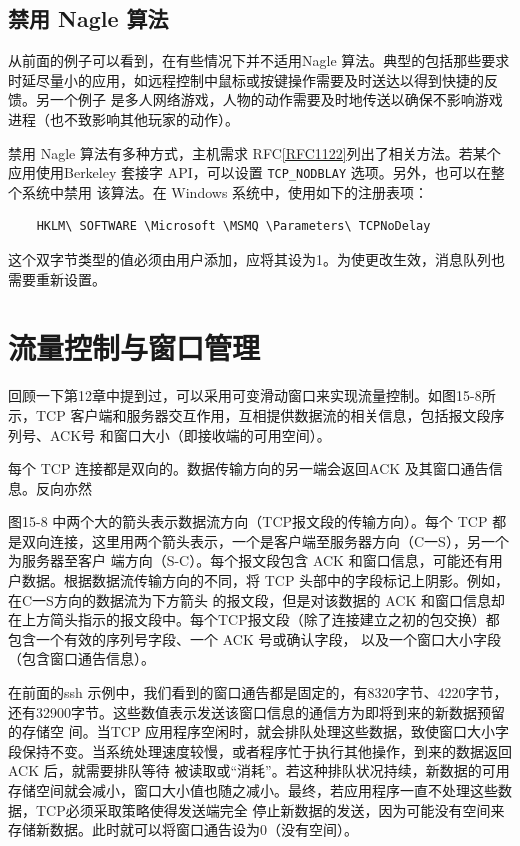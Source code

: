 \subsection{禁用 Nagle 算法}
从前面的例子可以看到，在有些情况下并不适用Nagle 算法。典型的包括那些要求时延尽量小的应用，如远程控制中鼠标或按键操作需要及时送达以得到快捷的反馈。另一个例子
是多人网络游戏，人物的动作需要及时地传送以确保不影响游戏进程（也不致影响其他玩家的动作）。

禁用 Nagle 算法有多种方式，主机需求 RFC\href{https://www.rfc-editor.org/rfc/rfc1122}{[RFC1122]}列出了相关方法。若某个应用使用Berkeley 套接字 API，可以设置 \verb|TCP_NODBLAY| 选项。另外，也可以在整个系统中禁用
该算法。在 Windows 系统中，使用如下的注册表项：
\begin{verbatim}
    HKLM\ SOFTWARE \Microsoft \MSMQ \Parameters\ TCPNoDelay
\end{verbatim}
这个双字节类型的值必须由用户添加，应将其设为1。为使更改生效，消息队列也需要重新设置。

\section{流量控制与窗口管理}
回顾一下第12章中提到过，可以采用可变滑动窗口来实现流量控制。如图15-8所示，TCP 客户端和服务器交互作用，互相提供数据流的相关信息，包括报文段序列号、ACK号
和窗口大小（即接收端的可用空间）。

每个 TCP 连接都是双向的。数据传输方向的另一端会返回ACK 及其窗口通告信息。反向亦然

图15-8 中两个大的箭头表示数据流方向（TCP报文段的传输方向）。每个 TCP 都是双向连接，这里用两个箭头表示，一个是客户端至服务器方向（C一S），另一个为服务器至客户
端方向（S-C）。每个报文段包含 ACK 和窗口信息，可能还有用户数据。根据数据流传输方向的不同，将 TCP 头部中的字段标记上阴影。例如，在C一S方向的数据流为下方箭头
的报文段，但是对该数据的 ACK 和窗口信息却在上方简头指示的报文段中。每个TCP报文段（除了连接建立之初的包交换）都包含一个有效的序列号字段、一个 ACK 号或确认字段，
以及一个窗口大小字段（包含窗口通告信息）。

在前面的ssh 示例中，我们看到的窗口通告都是固定的，有8320字节、4220字节，还有32900字节。这些数值表示发送该窗口信息的通信方为即将到来的新数据预留的存储空
间。当TCP 应用程序空闲时，就会排队处理这些数据，致使窗口大小字段保持不变。当系统处理速度较慢，或者程序忙于执行其他操作，到来的数据返回ACK 后，就需要排队等待
被读取或“消耗”。若这种排队状况持续，新数据的可用存储空间就会减小，窗口大小值也随之减小。最终，若应用程序一直不处理这些数据，TCP必须采取策略使得发送端完全
停止新数据的发送，因为可能没有空间来存储新数据。此时就可以将窗口通告设为0（没有空间）。

